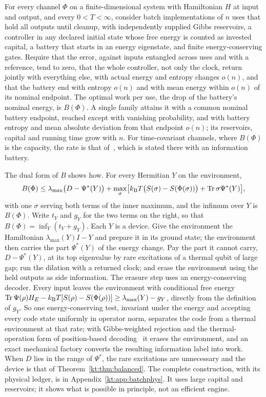 \begin{theorem}\label{kt:thm:batchlaw}
For every channel $\Phi$ on a finite-dimensional system with Hamiltonian $H$ at input and output, and every $0<T<\infty$, consider batch implementations of $n$ uses that hold all outputs until cleanup, with independently supplied Gibbs reservoirs, a controller in any declared initial state whose free energy is counted as invested capital, a battery that starts in an energy eigenstate, and finite energy-conserving gates. Require that the error, against inputs entangled across uses and with a reference, tend to zero, that the whole controller, not only the clock, return jointly with everything else, with actual energy and entropy changes $o(n)$, and that the battery end with entropy $o(n)$ and with mean energy within $o(n)$ of its nominal endpoint. The optimal work per use, the drop of the battery's nominal energy, is $B(\Phi)$. A single family attains it with a common nominal battery endpoint, reached except with vanishing probability, and with battery entropy and mean absolute deviation from that endpoint $o(n)$; its reservoirs, capital and running time grow with $n$. For time-covariant channels, where $B(\Phi)$ is the capacity, the rate is that of~\cite[Thm.~7.1]{FBB21}, which is stated there with an information battery.
\end{theorem}

The dual form of $B$ shows how. For every Hermitian $Y$ on the environment,
\[
B(\Phi)\le\lambda_{\max}\bigl(D-\Psi^*(Y)\bigr)+\max_\sigma\bigl[k_{\mathrm B} T\bigl(S(\sigma)-S(\Phi(\sigma))\bigr)+\operatorname{Tr}\sigma\Psi^*(Y)\bigr],
\]
with one $\sigma$ serving both terms of the inner maximum, and the infimum over $Y$ is $B(\Phi)$. Write $t_Y$ and $g_Y$ for the two terms on the right, so that $B(\Phi)=\inf_Y(t_Y+g_Y)$. Each $Y$ is a device. Give the environment the Hamiltonian $\lambda_{\max}(Y)I-Y$ and prepare it in its ground state; the environment then carries the part $\Psi^*(Y)$ of the energy change. Pay the part it cannot carry, $D-\Psi^*(Y)$, at its top eigenvalue by rare excitations of a thermal qubit of large gap; run the dilation with a returned clock; and erase the environment using the held outputs as side information. The erasure step uses an energy-conserving decoder. Every input leaves the environment with conditional free energy $\operatorname{Tr}\Psi(\rho)H_E-k_{\mathrm B} T[S(\rho)-S(\Phi(\rho))]\ge\lambda_{\max}(Y)-g_Y$, directly from the definition of $g_Y$. So one energy-conserving test, invariant under the energy and accepting every code state uniformly in operator norm, separates the code from a thermal environment at that rate; with Gibbs-weighted rejection and the thermal-operation form of position-based decoding~\cite{AnshuJainWarsi19,FBB21} it erases the environment, and an exact mechanical factory converts the resulting information label into work. When $D$ lies in the range of $\Psi^*$, the rare excitations are unnecessary and the device is that of Theorem~\ref{kt:thm:balanced}. The complete construction, with its physical ledger, is in Appendix~\ref{kt:app:batchphys}. It uses large capital and reservoirs; it shows what is possible in principle, not an efficient engine.

